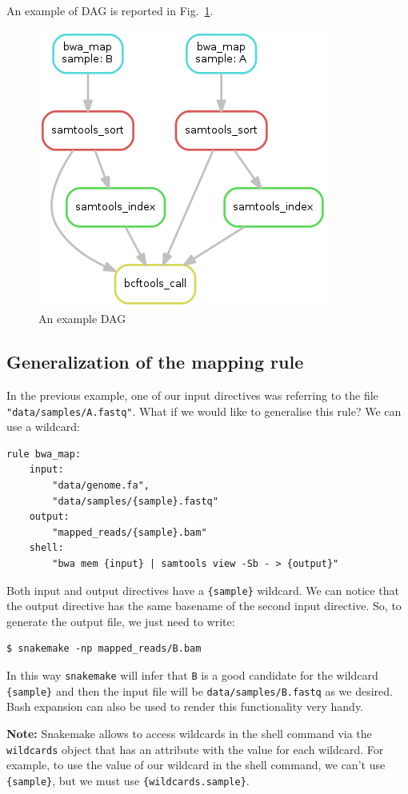 \documentclass[10pt]{article}
\begin{document}
An example of DAG is reported in Fig.~\ref{fig:dag}.

\begin{figure}[h!]
    \centering
    \includegraphics[width=.35\textwidth]{images/dag.png}
    \caption{An example DAG}
    \label{fig:dag}
\end{figure}

\subsection{Generalization of the mapping rule}

In the previous example, one of our input directives was referring to the file \texttt{"data/samples/A.fastq"}. What if we would like to generalise this rule? We can use a wildcard:

\begin{lstlisting}[style=mypython]
rule bwa_map:
    input:
        "data/genome.fa",
        "data/samples/{sample}.fastq"
    output:
        "mapped_reads/{sample}.bam"
    shell:
        "bwa mem {input} | samtools view -Sb - > {output}"
\end{lstlisting}

Both input and output directives have a \texttt{\{sample\}} wildcard. We can notice that the output directive has the same basename of the second input directive. So, to generate the output file, we just need to write:

\begin{lstlisting}[style=mybash]
$ snakemake -np mapped_reads/B.bam
\end{lstlisting}

In this way \texttt{snakemake} will infer that \texttt{B} is a good candidate for the wildcard \texttt{\{sample\}} and then the input file will be \texttt{data/samples/B.fastq} as we desired. Bash expansion can also be used to render this functionality very handy.

\textbf{Note:} Snakemake allows to access wildcards in the shell command via the \texttt{wildcards} object that has an attribute with the value for each wildcard. For example, to use the value of our wildcard in the shell command, we can't use \texttt{\{sample\}}, but we must use \texttt{\{wildcards.sample\}}.
\end{document}
